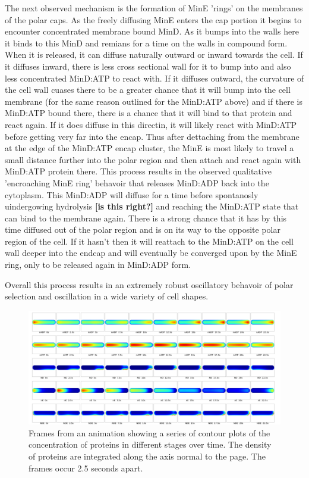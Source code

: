\documentclass[letterpaper,twocolumn,amsmath,amssymb,pre]{revtex4-1}
\newcommand{\red}[1]{{\bf \color{red} #1}}
\newcommand{\fixme}[1]{\red{[#1]}}
\begin{document}
The next observed mechanism is the formation of MinE 'rings' on the
membranes of the polar caps.  As the freely
diffusing MinE enters the cap portion it begins to encounter
concentrated membrane bound MinD.  As it bumps into the walls here it
binds to this MinD and remians for a time on the walls in compound
form.  When it is released, it can diffuse naturally outward or inward
towards the cell.  If it diffuses inward, there is less cross
sectional wall for it to bump into and also less concentrated MinD:ATP
to react with.  If it diffuses outward, the curvature of the cell wall
cuases there to be a greater chance that it will bump into the cell
membrane (for the same reason outlined for the MinD:ATP above) and if
there is MinD:ATP bound there, there is a chance that it will bind to
that protein and react again.  If it does diffuse in this directin, it
will likely react with MinD:ATP before getting very far into the
encap.  Thus after dettaching from the membrane at the edge of the
MinD:ATP encap cluster, the MinE is most likely to travel a small
distance further into the polar region and then attach and react again
with MinD:ATP protein there.  This process results in the observed
qualitative 'encroaching MinE ring' behavoir that releases MinD:ADP
back into the cytoplasm.  This MinD:ADP will diffuse for a time before
spontanosly uindergowing hydrolysis \fixme{is this right?} and
reaching the MinD:ATP state that can bind to the membrane again.
There is a strong chance that it has by this time diffused out of the
polar region and is on its way to the opposite polar region of the
cell.  If it hasn't then it will reattach to the MinD:ATP on the cell
wall deeper into the endcap and will eventually be converged upon by
the MinE ring, only to be released again in MinD:ADP form.

Overall this process results in an extremely robust oscillatory
behavoir of polar selection and oscillation in a wide variety of cell
shapes.

\begin{figure}
  \includegraphics[width=\textwidth]{../data/shape-p/plots/image-plot--p-400-50-0-0-1500.pdf}
  \caption{Frames from an animation showing a series of contour plots
    of the concentration of proteins in different stages over time.
    The density of proteins are integrated along the axis
    normal to the page. The frames occur 2.5 seconds apart.}
  \label{image-p}
\end{figure}
\end{document}
